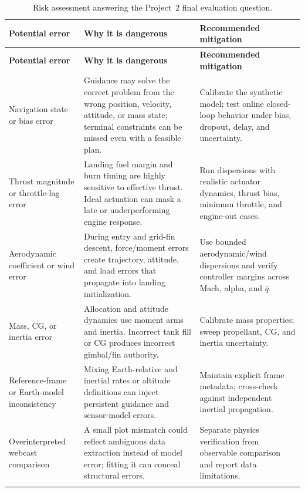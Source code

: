 \documentclass[11pt,letterpaper]{article}
\begin{document}
\begin{longtable}{p{}p{}p{}}
\toprule
\rowcolor{navy}\color{white}\textbf{Potential error} & \color{white}\textbf{Why it is dangerous} & \color{white}\textbf{Recommended mitigation}\\
\midrule
\endfirsthead
\toprule
\rowcolor{navy}\color{white}\textbf{Potential error} & \color{white}\textbf{Why it is dangerous} & \color{white}\textbf{Recommended mitigation}\\
\midrule
\endhead
Navigation state or bias error & Guidance may solve the correct problem from the wrong position, velocity, attitude, or mass state; terminal constraints can be missed even with a feasible plan. & Calibrate the synthetic model; test online closed-loop behavior under bias, dropout, delay, and uncertainty.\\
\rowcolor{lightblue}
Thrust magnitude or throttle-lag error & Landing fuel margin and burn timing are highly sensitive to effective thrust. Ideal actuation can mask a late or underperforming engine response. & Run dispersions with realistic actuator dynamics, thrust bias, minimum throttle, and engine-out cases.\\
Aerodynamic coefficient or wind error & During entry and grid-fin descent, force/moment errors create trajectory, attitude, and load errors that propagate into landing initialization. & Use bounded aerodynamic/wind dispersions and verify controller margins across Mach, alpha, and $\bar q$.\\
\rowcolor{lightblue}
Mass, CG, or inertia error & Allocation and attitude dynamics use moment arms and inertia. Incorrect tank fill or CG produces incorrect gimbal/fin authority. & Calibrate mass properties; sweep propellant, CG, and inertia uncertainty.\\
Reference-frame or Earth-model inconsistency & Mixing Earth-relative and inertial rates or altitude definitions can inject persistent guidance and sensor-model errors. & Maintain explicit frame metadata; cross-check against independent inertial propagation.\\
\rowcolor{lightblue}
Overinterpreted webcast comparison & A small plot mismatch could reflect ambiguous data extraction instead of model error; fitting it can conceal structural errors. & Separate physics verification from observable comparison and report data limitations.\\
\bottomrule
\caption{Risk assessment answering the Project~2 final evaluation question.}\label{tab:risks}
\end{longtable}
\end{document}
